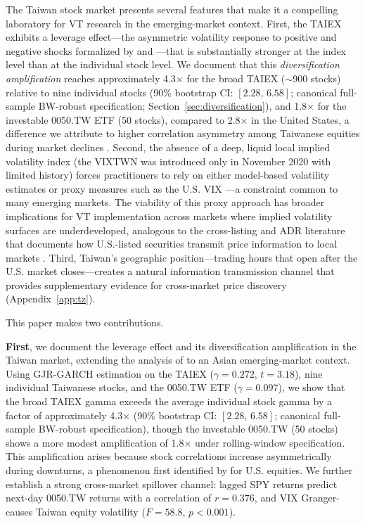 The Taiwan stock market presents several features that make it a compelling laboratory for VT research in the emerging-market context. First, the TAIEX exhibits a leverage effect---the asymmetric volatility response to positive and negative shocks formalized by \citet{black1976} and \citet{glosten1993}---that is substantially stronger at the index level than at the individual stock level. We document that this \textit{diversification amplification} reaches approximately 4.3$\times$ for the broad TAIEX ($\sim$900 stocks) relative to nine individual stocks (90\% bootstrap CI: $[2.28, \, 6.58]$; canonical full-sample BW-robust specification; Section~\ref{sec:diversification}), and 1.8$\times$ for the investable 0050.TW ETF (50 stocks), compared to 2.8$\times$ in the United States, a difference we attribute to higher correlation asymmetry among Taiwanese equities during market declines \citep{ang2002}. Second, the absence of a deep, liquid local implied volatility index (the VIXTWN was introduced only in November 2020 with limited history) forces practitioners to rely on either model-based volatility estimates or proxy measures such as the U.S. VIX \citep{whaley2000,whaley2009}---a constraint common to many emerging markets. The viability of this proxy approach has broader implications for VT implementation across markets where implied volatility surfaces are underdeveloped, analogous to the cross-listing and ADR literature that documents how U.S.-listed securities transmit price information to local markets \citep{gagnon2010}. Third, Taiwan's geographic position---trading hours that open after the U.S. market closes---creates a natural information transmission channel \citep{eun1989,hamao1990,lin1994} that provides supplementary evidence for cross-market price discovery (Appendix~\ref{app:tz}).

This paper makes two contributions.

\textbf{First}, we document the leverage effect and its diversification amplification in the Taiwan market, extending the analysis of \citet{ang2002} to an Asian emerging-market context. Using GJR-GARCH estimation on the TAIEX ($\gamma = 0.272$, $t = 3.18$), nine individual Taiwanese stocks, and the 0050.TW ETF ($\gamma = 0.097$), we show that the broad TAIEX gamma exceeds the average individual stock gamma by a factor of approximately 4.3$\times$ (90\% bootstrap CI: $[2.28, \, 6.58]$; canonical full-sample BW-robust specification), though the investable 0050.TW (50 stocks) shows a more modest amplification of 1.8$\times$ under rolling-window specification. This amplification arises because stock correlations increase asymmetrically during downturns, a phenomenon first identified by \citet{ang2002} for U.S. equities. We further establish a strong cross-market spillover channel: lagged SPY returns predict next-day 0050.TW returns with a correlation of $r = 0.376$, and VIX Granger-causes Taiwan equity volatility ($F = 58.8$, $p < 0.001$).

